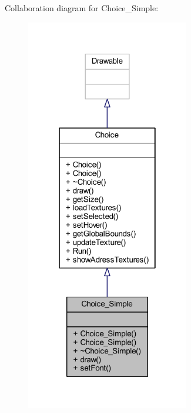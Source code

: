 Collaboration diagram for Choice\+\_\+\+Simple\+:\nopagebreak
\begin{figure}[H]
\begin{center}
\leavevmode
\includegraphics[width=202pt]{class_choice___simple__coll__graph}
\end{center}
\end{figure}
